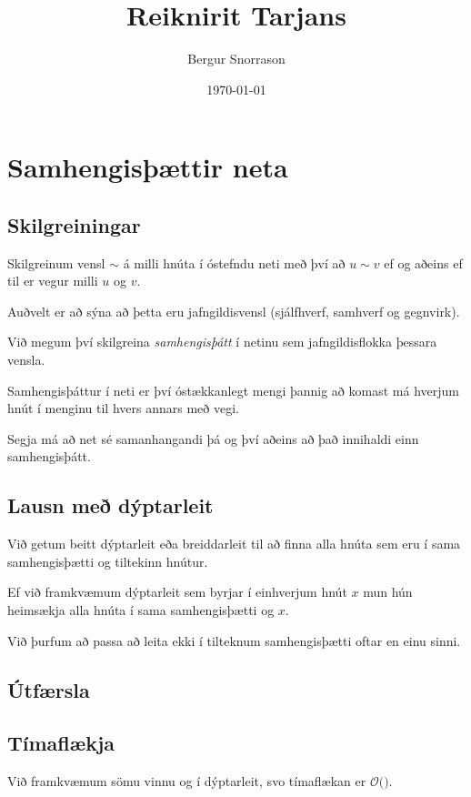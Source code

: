 \title{Reiknirit Tarjans}
\author{Bergur Snorrason}
\date{\today}



\frame{\titlepage}

\section{Samhengisþættir neta}
\subsection{Skilgreiningar}
{
    {
        \item<1-> Skilgreinum vensl $\sim$ á milli hnúta í óstefndu neti með því að $u \sim v$ ef og aðeins ef til er vegur milli $u$ og $v$.
        \item<2-> Auðvelt er að sýna að þetta eru jafngildisvensl (sjálfhverf, samhverf og gegnvirk).
        \item<3-> Við megum því skilgreina \emph{samhengisþátt} í netinu sem jafngildisflokka þessara vensla.
        \item<4-> Samhengisþáttur í neti er því óstækkanlegt mengi þannig að komast má hverjum hnút í menginu til hvers annars með vegi.
        \item<5-> Segja má að net sé samanhangandi þá og því aðeins að það innihaldi einn samhengisþátt.
    }
}

\subsection{Lausn með dýptarleit}
{
    {
        \item<1-> Við getum beitt dýptarleit eða breiddarleit til að finna alla hnúta sem eru í sama samhengisþætti og tiltekinn hnútur.
        \item<2-> Ef við framkvæmum dýptarleit sem byrjar í einhverjum hnút $x$ mun hún heimsækja alla hnúta í sama samhengisþætti og $x$.
        \item<3-> Við þurfum að passa að leita ekki í tilteknum samhengisþætti oftar en einu sinni.
    }
}

\subsection{Útfærsla}
{
}

\subsection{Tímaflækja}
{
    {
        \item<1-> Við framkvæmum sömu vinnu og í dýptarleit, svo tímaflækan er $\mathcal{O}($$)$.
    }
}

